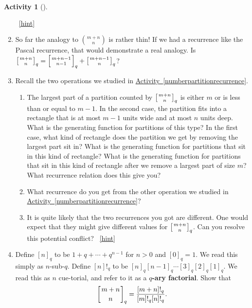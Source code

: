 \documentclass[10pt,]{book}
\newcommand{\terminology}[1]{\textbf{#1}}
\theoremstyle{plain}
\theoremstyle{definition}
\theoremstyle{definition}
\theoremstyle{definition}
\newtheorem{activity}[project]{Activity}
\numberwithin{equation}{chapter}
\newcommand{\qchoose}[2]{\left[{#1\atop#2}\right]_q}
\begin{document}
\begin{activity}[]
\begin{enumerate}[font=\bfseries,label=(\alph*),ref=\alph*]
~\hfill{\tiny\hyperlink{a-327.c}{[hint]}\hypertarget{q-327.c}{}}\item\label{task-284} \hypertarget{p-1626}{}%
So far the analogy to \(\binom{m+n}{n}\) is rather thin! If we had a recurrence like the Pascal recurrence, that would demonstrate a real analogy. Is \(\qchoose{m+n}{n}= \qchoose{m+n-1}{n-1}+\qchoose{m+n-1}{n}\)?%
\item\label{task-285} \hypertarget{p-1628}{}%
Recall the two operations we studied in \hyperref[numberpartitionrecurrence]{Activity~\ref{numberpartitionrecurrence}}.%
\begin{enumerate}[font=\bfseries,label=(\roman*),ref=\theenumi.\roman*]
\item\label{task-286} \hypertarget{p-1629}{}%
The largest part of a partition counted by \(\qchoose{m+n}{n}\) is either \(m\) or is less than or equal to \(m-1\).  In the second case, the partition fits into a rectangle that is at most \(m-1\) units wide and at most \(n\) units deep.  What is the generating function for partitions of this type?  In the first case, what kind of rectangle does the partition we get by removing the largest part sit in?  What is the generating function for partitions that sit in this kind of rectangle?  What is the generating function for partitions that sit in this kind of rectangle after we remove a largest part of size \(m\)?  What recurrence relation does this give you?%
\item\label{task-287} \hypertarget{p-1633}{}%
What recurrence do you get from the other operation we studied in \hyperref[numberpartitionrecurrence]{Activity~\ref{numberpartitionrecurrence}}?%
\item\label{task-288} \hypertarget{p-1635}{}%
It is quite likely that the two recurrences you got are different.  One would expect that they might give different values for \(\qchoose{m+n}{n}\).  Can you resolve this potential conflict?%
~\hfill{\tiny\hyperlink{a-327.e.iii}{[hint]}\hypertarget{q-327.e.iii}{}}\end{enumerate}
\item\label{task-289} \hypertarget{p-1638}{}%
Define \([n]_q\) to be \(1+q+\cdots+q^{n-1}\) for \(n>0\) and \([0]_q =1\).  We read this simply as \(n\)-sub-\(q\). Define \([n]!_q\) to be \([n]_q[n-1]_q\cdots [3]_q[2]_q[1]_q\). We read this as \(n\) cue-torial, and refer to it as a \terminology{\(q\)-ary factorial}. Show that%
\begin{equation*}
\qchoose{m+n}{n} = \frac{[m+n]!_q}{[m]!_q[n]!_q}.

\end{equation*}
\end{enumerate}
\end{activity}
\end{document}
